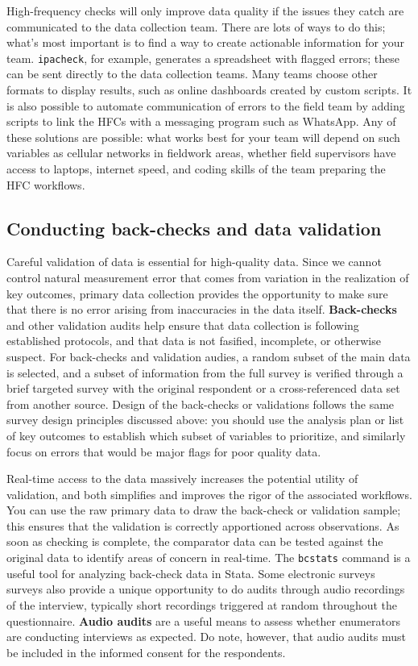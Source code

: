High-frequency checks will only improve data quality
if the issues they catch are communicated to the data collection team.
There are lots of ways to do this;
what's most important is to find a way to create actionable information for your team.
\texttt{ipacheck}, for example, generates a spreadsheet with flagged errors;
these can be sent directly to the data collection teams.
Many teams choose other formats to display results,
such as online dashboards created by custom scripts.
It is also possible to automate communication of errors to the field team
by adding scripts to link the HFCs with a messaging program such as WhatsApp.
Any of these solutions are possible:
what works best for your team will depend on such variables as
cellular networks in fieldwork areas, whether field supervisors have access to laptops,
internet speed, and coding skills of the team preparing the HFC workflows.

\subsection{Conducting back-checks and data validation}

Careful validation of data is essential for high-quality data.
Since we cannot control natural measurement error
that comes from variation in the realization of key outcomes,
primary data collection provides the opportunity to make sure
that there is no error arising from inaccuracies in the data itself.
\textbf{Back-checks} and
other validation audits help ensure that data collection is following established protocols,
and that data is not fasified, incomplete, or otherwise suspect.
For back-checks and validation audies, a random subset of the main data is selected,
and a subset of information from the full survey is
verified through a brief targeted survey with the original respondent
or a cross-referenced data set from another source.
Design of the back-checks or validations follows the same survey design
principles discussed above: you should use the analysis plan
or list of key outcomes to establish which subset of variables to prioritize,
and similarly focus on errors that would be major flags for poor quality data.

Real-time access to the data massively increases the potential utility of validation,
and both simplifies and improves the rigor of the associated workflows.
You can use the raw primary data to draw the back-check or validation sample;
this ensures that the validation is correctly apportioned across observations.
As soon as checking is complete, the comparator data can be tested against
the original data to identify areas of concern in real-time.
The \texttt{bcstats} command is a useful tool for analyzing back-check data in Stata.
Some electronic surveys surveys also provide a unique opportunity
to do audits through audio recordings of the interview,
typically short recordings triggered at random throughout the questionnaire.
\textbf{Audio audits} are a useful means to assess whether enumerators are conducting interviews as expected.
Do note, however, that audio audits must be included in the informed consent for the respondents.

